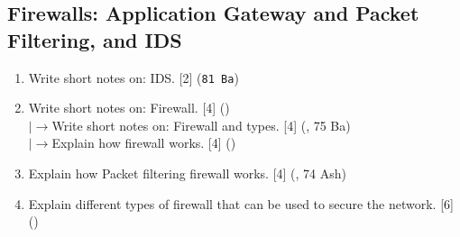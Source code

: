 \documentclass[12pt]{article}
\newcommand{\lb}{\\$\left|\rightarrow\right.$}
\begin{document}
	\subsection{Firewalls: Application Gateway and Packet Filtering, and IDS}
		\begin{enumerate}[noitemsep, topsep=0pt]
			\item Write short notes on: IDS. \hfill [2] (\texttt{81 Ba})

			\item Write short notes on: Firewall. \hfill [4] ()
			\lb Write short notes on: Firewall and types. \hfill [4] (, 75 Ba)
			\lb Explain how firewall works. \hfill [4] ()

			\item Explain how Packet filtering firewall works. \hfill [4] (, 74 Ash)

			\item Explain different types of firewall that can be used to secure the network. \hfill [6] ()
		\end{enumerate}
\end{document}
